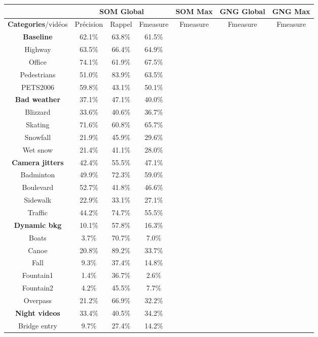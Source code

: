 	\begin{tableth}
    \begin{tabular}{|c|c|c|c|c|c|c|}
		\hline
		& \multicolumn{3}{c|}{SOM Global} & SOM Max & GNG Global & GNG Max\\
        \hline
        \textbf{Categories}/vidéos & Précision & Rappel & Fmeasure & Fmeasure & Fmeasure & Fmeasure\\
        \hline
        \textbf{Baseline} & 62.1\% & 63.8\% & 61.5\% & & &\\
		\hline
		Highway & 63.5\% & 66.4\% & 64.9\%& & &\\
		Office & 74.1\% & 61.9\% & 67.5\%& & &\\
		Pedestrians & 51.0\% & 83.9\% & 63.5\% & & &\\
		PETS2006 & 59.8\% & 43.1\% & 50.1\% & & &\\
		\hline
        \textbf{Bad weather} & 37.1\% & 47.1\% & 40.0\% & & &\\
		\hline
		Blizzard & 33.6\% & 40.6\% & 36.7\% & & &\\
		Skating & 71.6\% & 60.8\% & 65.7\% & & &\\
		Snowfall & 21.9\% & 45.9\% & 29.6\% & & &\\
		Wet snow & 21.4\% & 41.1\% & 28.0\% & & &\\
		\hline
        \textbf{Camera jitters} & 42.4\% & 55.5\% & 47.1\% & & &\\
		\hline
		Badminton & 49.9\% & 72.3\% & 59.0\% & & &\\
		Boulevard & 52.7\% & 41.8\% & 46.6\% & & &\\
		Sidewalk & 22.9\% & 33.1\% & 27.1\% & & &\\
		Traffic & 44.2\% & 74.7\% & 55.5\% & & &\\
		\hline
        \textbf{Dynamic bkg} & 10.1\% & 57.8\% & 16.3\% & & &\\
		\hline
		Boats & 3.7\% & 70.7\% & 7.0\% & & &\\
		Canoe & 20.8\% & 89.2\% & 33.7\% & & &\\
		Fall & 9.3\% & 37.4\% & 14.8\% & & &\\
		Fountain1 & 1.4\% & 36.7\% & 2.6\% & & &\\
		Fountain2 & 4.2\% & 45.5\% & 7.7\% & & &\\
		Overpass & 21.2\% & 66.9\% & 32.2\% & & &\\
		\hline
        \textbf{Night videos} & 33.4\% & 40.5\% & 34.2\% & & &\\
		\hline
		Bridge entry & 9.7\% & 27.4\% & 14.2\% & & &\\

\end{tabular}
\end{tableth}
